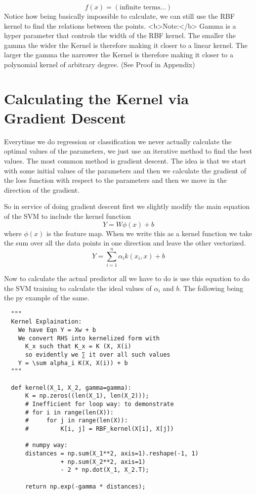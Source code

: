 \documentclass[hidelinks]{book}
\numberwithin{equation}{section}
\begin{document}
  $$ f(x) = (\text{infinite terms...}) $$ Notice how being basically
  impossible to calculate, we can still use the RBF kernel to find the
  relations between the points.
  <b>Note:</b> Gamma is a hyper parameter that controls the width of the RBF kernel.
  The smaller the gamma the wider the Kernel is therefore making it closer to a
  linear kernel. The larger the gamma the narrower the Kernel is therefore making
  it closer to a polynomial kernel of arbitrary degree. (See Proof in Appendix)

\section{Calculating the Kernel via Gradient Descent}
  Everytime we do regression or classification we never actually calculate the
  optimal values of the parameters, we just use an iterative method to find
  the best values. The most common method is gradient descent. The idea is
  that we start with some initial values of the parameters and then we
  calculate the gradient of the loss function with respect to the parameters
  and then we move in the direction of the gradient.

  So in service of doing gradient descent first we slightly modify the
  main equation of the SVM to include the kernel function
  $$ Y = W\phi(x) +b $$ where $\phi(x)$ is the feature map. When we write this
  as a kernel function we take the sum over all the data points in one direction
  and leave the other vectorized.
  $$ Y = \sum_{i=1}^n \alpha_i k(x_i, x) + b $$

  Now to calculate the actual predictor all we have to do is use this equation
  to do the SVM training to calculate the ideal values of $\alpha_i$ and $b$.
  The following being the py example of the same.
  \begin{verbatim}
  """
  Kernel Explaination:
    We have Eqn Y = Xw + b
    We convert RHS into kernelized form with
      K_x such that K_x = K (X, X(i)
      so evidently we ∑ it over all such values
    Y = \sum alpha_i K(X, X(i)) + b
  """

  def kernel(X_1, X_2, gamma=gamma):
      K = np.zeros((len(X_1), len(X_2)));
      # Inefficient for loop way: to demonstrate
      # for i in range(len(X)):
      #     for j in range(len(X)):
      #         K[i, j] = RBF_kernel(X[i], X[j])

      # numpy way:
      distances = np.sum(X_1**2, axis=1).reshape(-1, 1)
                + np.sum(X_2**2, axis=1)
                - 2 * np.dot(X_1, X_2.T);

      return np.exp(-gamma * distances);
  \end{verbatim}
\end{document}
